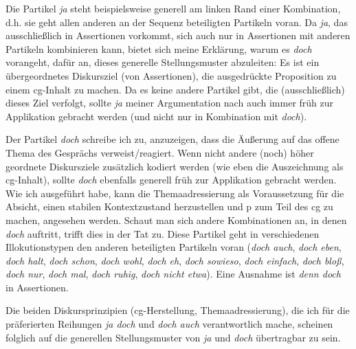 Die Partikel \textit{ja} steht beispielsweise generell am linken Rand einer Kombination, d.h. sie geht allen anderen an der Sequenz beteiligten Partikeln voran. Da \textit{ja}, das ausschließlich in Assertionen vorkommt, sich auch nur in Assertionen mit anderen Partikeln kombinieren kann, bietet sich meine Erklärung, warum es \textit{doch} vorangeht, dafür an, dieses generelle Stellungsmuster abzuleiten: Es ist ein übergeordnetes Diskursziel (von Assertionen), die ausgedrückte Proposition zu einem cg-Inhalt zu machen. Da es keine andere Partikel gibt, die (ausschließlich) dieses Ziel verfolgt, sollte \textit{ja} meiner Argumentation nach auch immer früh zur Applikation gebracht werden (und nicht nur in Kombination mit \textit{doch}). 

Der Partikel \textit{doch} schreibe ich zu, anzuzeigen, dass die Äußerung auf das offene Thema des Gesprächs verweist/reagiert. Wenn nicht andere (noch) höher geordnete Diskursziele zusätzlich kodiert werden (wie eben die Auszeichnung als cg-Inhalt), sollte \textit{doch} ebenfalls generell früh zur Applikation gebracht werden. Wie ich ausgeführt habe, kann die Themaadressierung als Voraussetzung für die Absicht, einen stabilen Kontextzustand herzustellen und p zum Teil des cg zu machen, angesehen werden. Schaut man sich andere Kombinationen an, in denen \textit{doch} auftritt, trifft dies in der Tat zu. Diese Partikel geht in verschiedenen Illokutionstypen den anderen beteiligten Partikeln voran (\textit{doch auch}, \textit{doch eben}, \textit{doch halt}, \textit{doch schon}, \textit{doch wohl}, \textit{doch eh}, \textit{doch sowieso}, \textit{doch einfach}, \textit{doch bloß}, \textit{doch nur}, \textit{doch mal}, \textit{doch ruhig}, \textit{doch nicht etwa}). Eine Ausnahme ist \textit{denn doch} in Assertionen.

Die beiden Diskursprinzipien (cg-Herstellung, Themaadressierung), die ich für die präferierten Reihungen \textit{ja doch} und \textit{doch auch} verantwortlich mache, scheinen folglich auf die generellen Stellungsmuster von \textit{ja} und \textit{doch} übertragbar zu sein.

